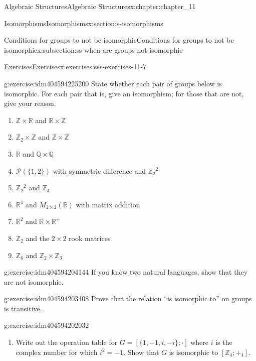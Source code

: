 \documentclass[twoside,10pt,]{book}
\numberwithin{equation}{section}
\begin{document}
\begin{chapterptx}{Algebraic Structures}{}{Algebraic Structures}{}{}{x:chapter:chapter_11}
\begin{sectionptx}{Isomorphisms}{}{Isomorphisms}{}{}{x:section:s-isomorphisms}
\begin{subsectionptx}{Conditions for groups to not be isomorphic}{}{Conditions for groups to not be isomorphic}{}{}{x:subsection:ss-when-are-groups-not-isomorphic}
\begin{enumerate}[label=(\alph*)]
\end{enumerate}
%
\end{subsectionptx}
%
%
\typeout{************************************************}
\typeout{************************************************}
%
\begin{exercises-subsection}{Exercises}{}{Exercises}{}{}{x:exercises:sss-exercises-11-7}
\begin{divisionexercise}{1}{}{}{g:exercise:idm404594225200}%
State whether each pair of groups below is isomorphic. For each pair that is, give an isomorphism; for those that are not, give your reason.%
\begin{enumerate}[label=(\alph*)]
\item{}\(\mathbb{Z} \times  \mathbb{R}\) and \(\mathbb{R} \times  \mathbb{Z}\)%
\item{}\(\mathbb{Z}_2\times \mathbb{Z}\)  and \(\mathbb{Z} \times  \mathbb{Z}\)%
\item{}\(\mathbb{R}\) and \(\mathbb{Q} \times  \mathbb{Q}\)%
\item{}\(\mathcal{P}(\{1, 2\})\) with symmetric difference and \(\mathbb{Z}_2{}^2\)%
\item{}\(\mathbb{Z}_2{}^2\) and \(\mathbb{Z}_4\)%
\item{}\(\mathbb{R}^4\) and \(M_{2\times 2}(\mathbb{R})\) with matrix addition%
\item{}\(\mathbb{R}^2\) and \(\mathbb{R} \times  \mathbb{R}^+\)%
\item{}\(\mathbb{Z}_2\) and the \(2 \times  2\) rook matrices%
\item{}\(\mathbb{Z}_6\) and \(\mathbb{Z}_2\times  \mathbb{Z}_3\)%
\end{enumerate}
%
\end{divisionexercise}%
\begin{divisionexercise}{2}{}{}{g:exercise:idm404594204144}%
If you know two natural languages, show that they are not isomorphic.%
\end{divisionexercise}%
\begin{divisionexercise}{3}{}{}{g:exercise:idm404594203408}%
Prove that the relation ``is isomorphic to'' on groups is transitive.%
\end{divisionexercise}%
\begin{divisionexercise}{4}{}{}{g:exercise:idm404594202032}%
%
\begin{enumerate}[label=(\alph*)]
\item{}Write out the operation table for \(G = [\{1, -1, i, -i \}; \cdot ]\) where \(i\) is the complex number for which \(i^2 = - 1\). Show that \(G\) is isomorphic to \(\left[\mathbb{Z}_4;+_4\right]\).%

\end{enumerate}
\end{divisionexercise}
\end{exercises-subsection}
\end{sectionptx}
\end{chapterptx}
\end{document}
